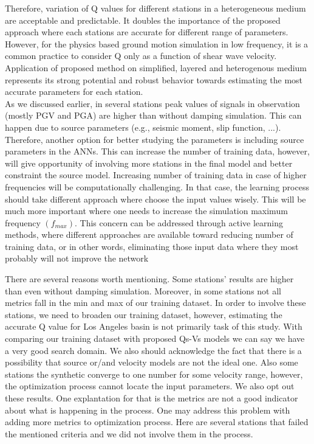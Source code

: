 Therefore, variation of Q values for different stations in a heterogeneous medium are acceptable and predictable. It doubles the importance of the proposed approach where each stations are accurate for different range of parameters. However, for the physics based ground motion simulation in low frequency, it is a common practice to consider Q only as a function of shear wave velocity. Application of proposed method on simplified, layered and heterogenous medium represents its strong potential and robust behavior towards estimating the most accurate parameters for each station.\\

As we discussed earlier, in several stations peak values of signals in observation (mostly PGV and PGA) are higher than without damping simulation. This can happen due to source parameters (e.g., seismic moment, slip function, ...). Therefore, another option for better studying the parameters is including source parameters in the ANNs. This can increase the number of training data, however, will give opportunity of involving more stations in the final model and better constraint the source model. Increasing number of training data in case of higher frequencies will be computationally challenging. In that case, the learning process should take different approach where choose the input values wisely. This will be much more important where one needs to increase the simulation maximum frequency $(f_{max})$.  This concern can be addressed through active learning methods, where different approaches are available toward reducing number of training data, or in other words, eliminating those input data where they most probably will not improve the network \citep[e.g., see][ and the references therein.]{settles.tr09} 


There are several reasons worth mentioning. Some stations' results are higher than even without damping simulation. Moreover, in some stations not all metrics fall in the min and max of our training dataset. In order to involve these stations, we need to broaden our training dataset, however, estimating the accurate Q value for Los Angeles basin is not primarily task of this study. With comparing our training dataset with proposed Qs-Vs models we can say we have a very good search domain. We also should acknowledge the fact that there is a possibility that source or/and velocity models are not the ideal one. Also some stations the synthetic converge to one number for some velocity range, however, the optimization process cannot locate the input parameters. We also opt out these results. One explantation for that is the metrics are not a good indicator about what is happening in the process. One may address this problem with adding more metrics to optimization process. Here are several stations that failed the mentioned criteria and we did not involve them in the process.



 


